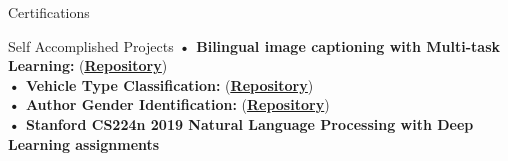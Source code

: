 \documentclass{resume} %
\begin{document}
\begin{rSection}{Certifications}




\end{rSection}

\newpage
\begin{rSection}{Self Accomplished Projects}
\textbf{• Bilingual image captioning with Multi-task Learning:} (\textbf{\underline{\href{https://github.com/Ledengary/bilingual-image-captioning}{Repository}}}) \\
\textbf{• Vehicle Type Classification:}  (\textbf{\underline{\href{https://github.com/Ledengary/vehicle-type-classification}{Repository}}}) \\
\textbf{• Author Gender Identification:}  (\textbf{\underline{\href{https://github.com/Ledengary/Author-gender-classification}{Repository}}}) \\
\textbf{• Stanford CS224n 2019  Natural Language Processing with Deep Learning assignments} 

\end{rSection}
\end{document}
